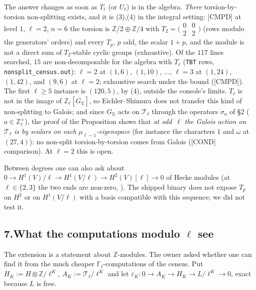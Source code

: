 \documentclass[11pt]{article}
\newcommand{\Z}{\mathbb{Z}}
\newcommand{\Q}{\mathbb{Q}}
\newcommand{\F}{\mathbb{F}}
\newcommand{\code}[1]{\texttt{#1}}
\newcommand{\file}[1]{\texttt{#1}}
\newcommand{\CMPD}{\textsf{\small[CMPD]}}
\newcommand{\PGCOND}{\textsf{\small[COND]}}
\newcommand{\smat}[4]{\bigl(\begin{smallmatrix}#1&#2\\#3&#4\end{smallmatrix}\bigr)}
\begin{document}
The answer changes as soon as $T_\ell$ (or $U_\ell$) is in the algebra. \emph{There} torsion-by-torsion non-splitting exists, and it is {}(3),(4) in the integral setting: \CMPD{} at level $1$, $\ell=2$, $n=6$ the torsion is $\Z/2\oplus\Z/4$ with $T_2=\smat{0}{0}{2}{2}$ (rows modulo the generators' orders) and every $T_p$, $p$ odd, the scalar $1+p$, and the module is not a direct sum of $T_2$-stable cyclic groups (exhaustive). Of the $117$ lines searched, $15$ are non-decomposable for the algebra with $T_\ell$ (\code{TBT} rows, \file{nonsplit\_census.out}): $\ell=2$ at $(1,6)$, $(1,10)$, $\dots$, $\ell=3$ at $(1,24)$, $(1,42)$, and $(9,6)$ at $\ell=2$; exhaustive search under the bound (\CMPD). The first $\ell\ge5$ instance is $(120,5)$, by {}(4), outside the console's limits. $T_\ell$ is not in the image of $\Z_\ell[G_\Q]$, so Eichler--Shimura does not transfer this kind of non-splitting to Galois; and since $G_\Q$ acts on $\mathcal T_\ell$ through the operators $\sigma_a$ of \S2 ($a\in\Z_\ell^{\times}$), the proof of the Proposition shows that \emph{at odd~$\ell$ the Galois action on $\mathcal T_\ell$ is by scalars on each $\mu_{\ell-1}$-eigenspace} (for instance the characters $1$ and $\omega$ at $(27,4)$): no non-split torsion-by-torsion comes from Galois (\PGCOND{} comparison). At $\ell=2$ this is open.

Between degrees one can also ask about $0\to H^{1}(V)/\ell\to H^{1}(V/\ell)\to H^{2}(V)[\ell]\to0$ of Hecke modules (at $\ell\in\{2,3\}$ the two ends are non-zero, {}). The shipped binary does not expose $T_p$ on $H^{2}$ or on $H^{1}(V/\ell)$ with a basis compatible with this sequence; we did not test it.

\subsection*{7.\quad What the computations modulo $\ell$ see}

The extension is a statement about $\Z$-modules. The owner asked whether one can find it from the much cheaper $\F_\ell$-computations of the census. Put $H_K:=H\otimes\Z/\ell^{K}$, $A_K:=\mathcal T_\ell/\ell^{K}$ and let
$\varepsilon_K\colon0\to A_K\to H_K\to L/\ell^{K}\to0$, exact because $L$ is free.
\end{document}
